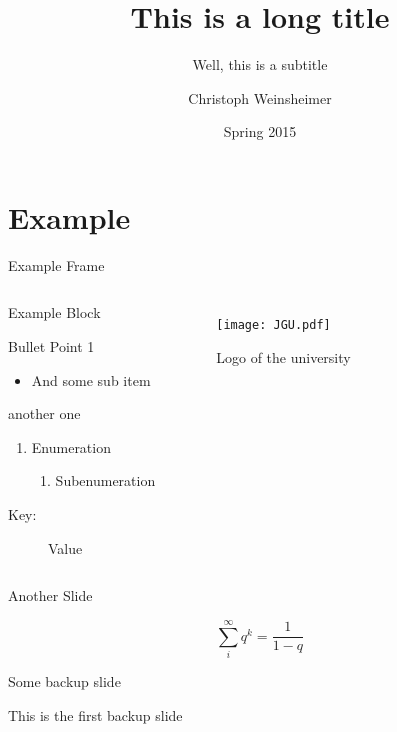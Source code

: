 \documentclass{beamer}
\title[Short Title]{This is a long title}
\subtitle{Well, this is a subtitle}
\author{Christoph Weinsheimer}
\institute[Uni Mainz]
{%
    Johannes Gutenberg-University Mainz
}
\date{Spring 2015}
\begin{document}
\maketitle



\section{Example}

\begin{frame}{Example Frame}
  \begin{columns}
      \begin{block}{Example Block}
        \begin{wideitemize}
          \item Bullet Point 1
            \begin{itemize}
              \item And some sub item
            \end{itemize}
          \item another one
        \end{wideitemize}
        \begin{enumerate}
          \item Enumeration
            \begin{enumerate}
              \item Subenumeration
            \end{enumerate}
        \end{enumerate}
        \begin{description}
            \item[Key:] Value
        \end{description}
      \end{block}
      \begin{figure}[ht]
        \centering
        \texttt{[image: JGU.pdf]}
        \caption{Logo of the university}
      \end{figure}
  \end{columns}
\end{frame}



\begin{frame}{Another Slide}
  \begin{center}
    \[
      \sum_i^\infty q^k = \frac{1}{1-q}
    \]
  \end{center}
\end{frame}



\backupbegin
\begin{frame}{Some backup slide}
  \begin{center}
    This is the first backup slide
  \end{center}
\end{frame}
\backupend
\end{document}
